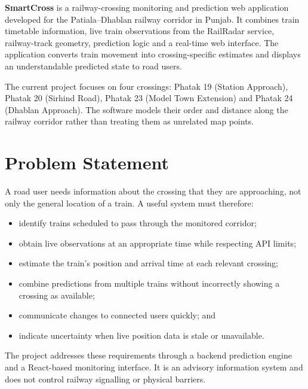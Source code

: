 \documentclass[11pt,a4paper]{report}
\newcommand{\project}{\textbf{SmartCross}}
\begin{document}
\project{} is a railway-crossing monitoring and prediction web application developed for the Patiala--Dhablan railway corridor in Punjab. It combines train timetable information, live train observations from the RailRadar service, railway-track geometry, prediction logic and a real-time web interface. The application converts train movement into crossing-specific estimates and displays an understandable predicted state to road users.

The current project focuses on four crossings: Phatak 19 (Station Approach), Phatak 20 (Sirhind Road), Phatak 23 (Model Town Extension) and Phatak 24 (Dhablan Approach). The software models their order and distance along the railway corridor rather than treating them as unrelated map points.

\section{Problem Statement}
A road user needs information about the crossing that they are approaching, not only the general location of a train. A useful system must therefore:
\begin{itemize}
  \item identify trains scheduled to pass through the monitored corridor;
  \item obtain live observations at an appropriate time while respecting API limits;
  \item estimate the train's position and arrival time at each relevant crossing;
  \item combine predictions from multiple trains without incorrectly showing a crossing as available;
  \item communicate changes to connected users quickly; and
  \item indicate uncertainty when live position data is stale or unavailable.
\end{itemize}

The project addresses these requirements through a backend prediction engine and a React-based monitoring interface. It is an advisory information system and does not control railway signalling or physical barriers.
\end{document}
